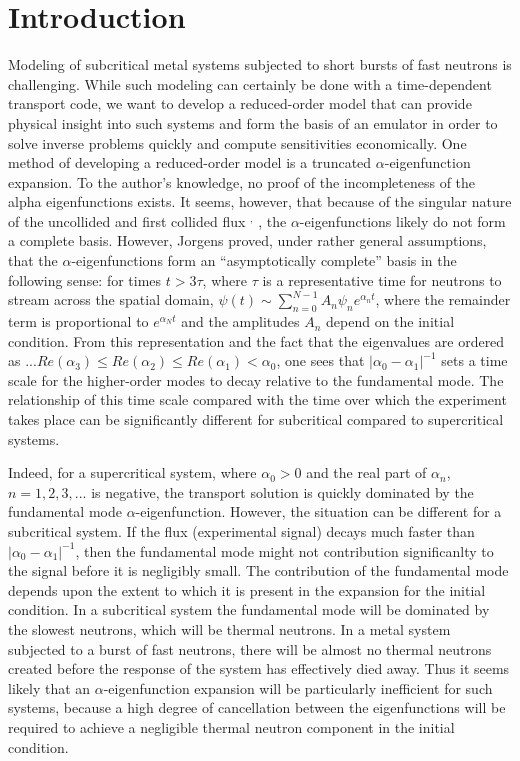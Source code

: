 \documentclass[12pt]{article}
\begin{document}
\section{Introduction}
Modeling of subcritical metal systems subjected to short bursts of fast 
	neutrons is challenging. 
While such modeling can certainly be done with a time-dependent transport code, 
	we want to develop a reduced-order model that can provide physical insight 
	into such systems and form the basis of an emulator in order to solve inverse 
	problems quickly and compute sensitivities economically. 
One method of developing a reduced-order model is a truncated
	$\alpha$-eigenfunction expansion. 
To the author's knowledge, no proof of the incompleteness of the alpha 
	eigenfunctions exists. 
It seems, however, that because of the singular nature of the uncollided and    
	first collided flux \cite{bondarenko1996}$^,$\cite{larsen1975} , the $\alpha$-eigenfunctions likely do not form a 
	complete basis. 
However, Jorgens proved, under rather general assumptions, that the 
	$\alpha$-eigenfunctions form an ``asymptotically complete'' basis in the 
	following sense: for times $t>3\tau$, where $\tau$ is a representative time 
	for neutrons to stream across the spatial domain, $\psi\left(t\right) \sim 
	\sum_{n=0}^{N-1} A_n \psi_n e^{\alpha_n t}$, where the remainder term is 
	proportional to $e^{\alpha_N t}$ and the amplitudes $A_n$ depend on the 
	initial condition. 
From this representation and the fact that the eigenvalues are ordered as 
	$...Re\left(\alpha_3\right)\le Re\left(\alpha_2\right)\le  Re\left(\alpha_1\right) < \alpha_0$, one sees that 
	$|\alpha_0 - \alpha_1|^{-1}$ sets a time scale for the higher-order modes to 
	decay relative to the fundamental mode. 
The relationship of this time scale compared with the time over which the 
	experiment takes place can be significantly different for subcritical 
	compared to supercritical systems.  

Indeed, for a supercritical system, where $\alpha_0 > 0$ and the real part of 
	$\alpha_n$, $n=1,2,3,...$ is negative, the transport solution is quickly 
	dominated by the fundamental mode $\alpha$-eigenfunction.
However, the situation can be different for a subcritical system. 
If the flux (experimental signal) decays much faster than $|\alpha_0 - 
	\alpha_1|^{-1}$, then the fundamental mode might not contribution 
	significanlty to the signal before it is negligibly small. 
The contribution of the fundamental mode depends upon the extent to which it is 
	present in the expansion for the initial condition. 
In a subcritical system the fundamental mode will be dominated by the slowest 
	neutrons, which will be thermal neutrons. 
In a metal system subjected to a burst of fast neutrons, there will be almost 
	no thermal neutrons created before the response of the system has effectively 
	died away.  
Thus it seems likely that an $\alpha$-eigenfunction expansion will be 
	particularly inefficient for such systems, because a high degree of 
	cancellation between the eigenfunctions will be required to achieve a 
	negligible thermal neutron component in the initial condition.  
\end{document}
